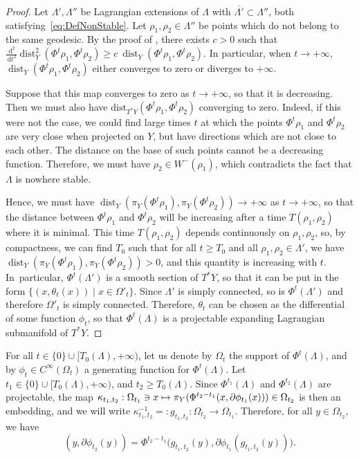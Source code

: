 \documentclass[JEP,XML,SOM,Unicode,published]{cedram}
\newcommand\mto{\mathchoice{\longmapsto}{\mapsto}{\mapsto}{\mapsto}}
\let\sep\mid
\newcommand{\rd}{\,\mathrm{d}}
\DeclareMathOperator{\dist}{dist}
\theoremstyle{plain}
\theoremstyle{definition}
\begin{document}
\begin{proof}
Let $\Lambda', \Lambda''$ be Lagrangian extensions of $\Lambda$ with $\overline{\Lambda'}\subset \Lambda''$, both satisfying~\eqref{eq:DefNonStable}. Let $\rho_1,\rho_2\in \Lambda''$ be points which do not belong to the same geodesic. By the proof of \cite[Th.\,4.8.2]{Jost}, there exists $c>0$ such that $ \frac{\rd ^2}{\rd t^2} \dist_Y^2(\Phi^t \rho_1,\Phi^t \rho_2) \geq c~ \dist_Y(\Phi^t \rho_1,\Phi^t \rho_2)$. In particular, when $t\to +\infty$, $\dist_Y(\Phi^t \rho_1,\Phi^t \rho_2) $ either converges to zero or diverges to $+\infty$.

Suppose that this map converges to zero as $t\to +\infty$, so that it is decreasing. Then we must also have $\mathrm{dist}_{T^*Y}(\Phi^t \rho_1,\Phi^t \rho_2)$ converging to zero. Indeed, if this were not the case, we could find large times $t$ at which the points $\Phi^t \rho_1$ and $\Phi^t \rho_2$ are very close when projected on $Y$, but have directions which are not close to each other. The distance on the base of such points cannot be a decreasing function. Therefore, we must have $\rho_2\in W^-(\rho_1)$, which contradicts the fact that $\Lambda$ is nowhere stable.

Hence, we must have $\dist_Y(\pi_Y(\Phi^t \rho_1),\pi_Y(\Phi^t \rho_2))\to +\infty$ as $t\to+\infty$, so that the distance between $\Phi^t \rho_1$ and $\Phi^t \rho_2$ will be increasing after a time $T(\rho_1,\rho_2)$ where it is minimal. This time $T(\rho_1, \rho_2)$ depends continuously on $\rho_1,\rho_2$, so, by compactness, we can find $T_0$ such that for all $t\geq T_0$ and all $\rho_1,\rho_2 \in \Lambda'$, we have $\dist_Y(\pi_Y(\Phi^t \rho_1),\pi_Y(\Phi^t \rho_2))>0$, and this quantity is increasing with $t$. In~particular, $\Phi^t(\Lambda')$ is a smooth section of $T^*Y$, so that it can be put in the form $\{(x, \theta_{t}(x))\sep x\in \Omega'_{t} \}$. Since $\Lambda'$ is simply connected, so is $\Phi^t(\Lambda')$ and therefore $\Omega'_{t}$ is simply connected. Therefore, $\theta_t$ can be chosen as the differential of some function $\phi_t$, so that $\Phi^t(\Lambda)$ is a projectable expanding Lagrangian submanifold of $T^*Y$.
\end{proof}

For all $t \in \{0\}\cup [T_0(\Lambda), +\infty)$, let us denote by $\Omega_t$ the support of $\Phi^t(\Lambda)$, and by $\phi_{t}\in C^\infty(\Omega_{t})$ a generating function for $\Phi^{t}(\Lambda)$.
Let $t_1\in \{0\}\cup [T_0(\Lambda), +\infty)$, and $t_2 \geq T_0(\Lambda)$. Since $\Phi^{t_1}(\Lambda)$ and $\Phi^{t_2}(\Lambda)$ are projectable, the map $\kappa_{t_1,t_2}:\Omega_{t_1}\ni x \mto\pi_Y(\Phi^{t_2-t_1}(x,\partial\phi_{t_1}(x)))\in\Omega_{t_2}$ is then an embedding, and we will write $\kappa_{t_1,t_2}^{-1} =: g_{t_1,t_2}:\Omega_{t_2}\to\Omega_{t_1}$. Therefore, for all $y\in \Omega_{t_2}$, we have
\begin{equation}\label{eq:DefG}
(y,\partial\phi_{t_2}(y))=\Phi^{t_2-t_1} \bigl(g_{t_1,t_2}(y),\partial\phi_{t_1}(g_{t_1,t_2}(y)) \bigr).
\end{equation}
\end{document}
